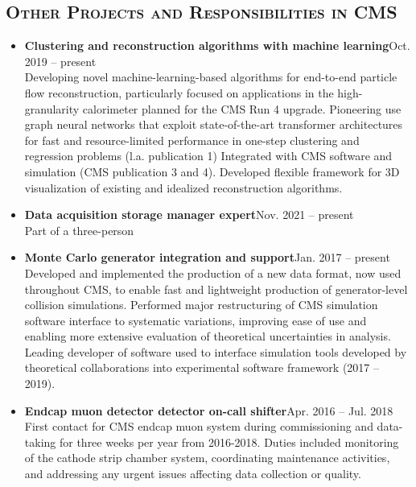 \documentclass[10pt]{res} %
\begin{document}
\begin{resume}
\section{\textsc{Other Projects and Responsibilities in CMS}}
\begin{itemize}
  \item\textbf{Clustering and reconstruction algorithms with machine learning}\hfill{Oct. 2019 -- present} \\
    Developing novel machine-learning-based algorithms for end-to-end particle flow reconstruction,
    particularly focused on applications in the high-granularity calorimeter planned for the CMS Run 4 upgrade.
    Pioneering use graph neural networks that exploit state-of-the-art transformer architectures for
    fast and resource-limited performance in one-step clustering and regression problems (l.a. publication 1)
    Integrated with CMS software and simulation (CMS publication 3 and 4).
    Developed flexible framework for 3D visualization of existing and idealized reconstruction algorithms.

  \item\textbf{Data acquisition storage manager expert}\hfill{Nov. 2021 -- present} \\
    Part of a three-person 

  \item\textbf{Monte Carlo generator integration and support}\hfill{Jan. 2017 -- present} \\
    Developed and implemented the production of a new data format, now used throughout CMS, to enable fast and lightweight production
    of generator-level collision simulations. Performed major restructuring of CMS simulation software interface
    to systematic variations, improving ease of use and enabling more extensive evaluation of theoretical uncertainties in analysis.
    Leading developer of software used to interface simulation tools
    developed by theoretical collaborations into experimental software framework (2017 -- 2019).

  \item\textbf{Endcap muon detector detector on-call shifter}\hfill{Apr. 2016 -- Jul. 2018} \\
    First contact for CMS endcap muon system during commissioning and data-taking for three weeks per year
    from 2016-2018. Duties included monitoring of the cathode strip chamber system, coordinating maintenance activities,
    and addressing any urgent issues affecting data collection or quality.


\end{itemize}
\end{resume}
\end{document}
